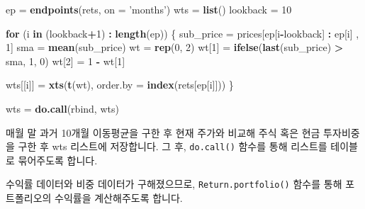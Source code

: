 \documentclass[12pt,]{book}
\newenvironment{Shaded}{\begin{snugshade}}{\end{snugshade}}
\newcommand{\ControlFlowTok}[1]{\textcolor[rgb]{0.13,0.29,0.53}{\textbf{#1}}}
\newcommand{\DataTypeTok}[1]{\textcolor[rgb]{0.13,0.29,0.53}{#1}}
\newcommand{\DecValTok}[1]{\textcolor[rgb]{0.00,0.00,0.81}{#1}}
\newcommand{\KeywordTok}[1]{\textcolor[rgb]{0.13,0.29,0.53}{\textbf{#1}}}
\newcommand{\NormalTok}[1]{#1}
\newcommand{\OperatorTok}[1]{\textcolor[rgb]{0.81,0.36,0.00}{\textbf{#1}}}
\newcommand{\OtherTok}[1]{\textcolor[rgb]{0.56,0.35,0.01}{#1}}
\newcommand{\StringTok}[1]{\textcolor[rgb]{0.31,0.60,0.02}{#1}}
\begin{document}
\begin{Shaded}
\begin{Highlighting}[]
\NormalTok{ep =}\StringTok{ }\KeywordTok{endpoints}\NormalTok{(rets, }\DataTypeTok{on =} \StringTok{'months'}\NormalTok{)}
\NormalTok{wts =}\StringTok{ }\KeywordTok{list}\NormalTok{()}
\NormalTok{lookback =}\StringTok{ }\DecValTok{10}

\ControlFlowTok{for}\NormalTok{ (i }\ControlFlowTok{in}\NormalTok{ (lookback}\OperatorTok{+}\DecValTok{1}\NormalTok{) }\OperatorTok{:}\StringTok{ }\KeywordTok{length}\NormalTok{(ep)) \{}
\NormalTok{  sub_price =}\StringTok{ }\NormalTok{prices[ep[i}\OperatorTok{-}\NormalTok{lookback] }\OperatorTok{:}\StringTok{ }\NormalTok{ep[i] , }\DecValTok{1}\NormalTok{]}
\NormalTok{  sma =}\StringTok{ }\KeywordTok{mean}\NormalTok{(sub_price)}
\NormalTok{  wt =}\StringTok{ }\KeywordTok{rep}\NormalTok{(}\DecValTok{0}\NormalTok{, }\DecValTok{2}\NormalTok{)}
\NormalTok{  wt[}\DecValTok{1}\NormalTok{] =}\StringTok{ }\KeywordTok{ifelse}\NormalTok{(}\KeywordTok{last}\NormalTok{(sub_price) }\OperatorTok{>}\StringTok{ }\NormalTok{sma, }\DecValTok{1}\NormalTok{, }\DecValTok{0}\NormalTok{)}
\NormalTok{  wt[}\DecValTok{2}\NormalTok{] =}\StringTok{ }\DecValTok{1} \OperatorTok{-}\StringTok{ }\NormalTok{wt[}\DecValTok{1}\NormalTok{]}
  
\NormalTok{  wts[[i]] =}\StringTok{ }\KeywordTok{xts}\NormalTok{(}\KeywordTok{t}\NormalTok{(wt), }\DataTypeTok{order.by =} \KeywordTok{index}\NormalTok{(rets[ep[i]]))}
\NormalTok{\}}

\NormalTok{wts =}\StringTok{ }\KeywordTok{do.call}\NormalTok{(rbind, wts)}
\end{Highlighting}
\end{Shaded}

매월 말 과거 10개월 이동평균을 구한 후 현재 주가와 비교해 주식 혹은 현금 투자비중을 구한 후 wts 리스트에 저장합니다. 그 후, \texttt{do.call()} 함수를 통해 리스트를 테이블로 묶어주도록 합니다.

수익률 데이터와 비중 데이터가 구해졌으므로, \texttt{Return.portfolio()} 함수를 통해 포트폴리오의 수익률을 계산해주도록 합니다.

\begin{Shaded}
\end{Shaded}
\end{document}
